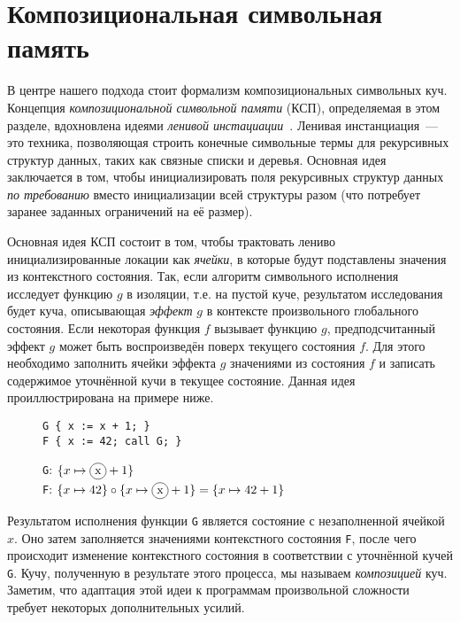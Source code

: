 \section{Композициональная символьная память}
\label{sec:state}

В центре нашего подхода стоит формализм композициональных символьных куч. Концепция \emph{композициональной символьной памяти} (КСП), определяемая в этом разделе, вдохновлена идеями \emph{ленивой инстациации}~\cite{khurshid2003generalized,deng2012efficient}. Ленивая инстанциация~--- это техника, позволяющая строить конечные символьные термы для рекурсивных структур данных, таких как связные списки и деревья. Основная идея заключается в том, чтобы инициализировать поля рекурсивных структур данных \emph{по требованию} вместо инициализации всей структуры разом (что потребует заранее заданных ограничений на её размер).

Основная идея КСП состоит в том, чтобы трактовать лениво инициализированные локации как \emph{ячейки}, в которые будут подставлены значения из контекстного состояния. Так, если алгоритм символьного исполнения исследует функцию $g$ в изоляции, т.е. на пустой куче, результатом исследования будет куча, описывающая \emph{эффект} $g$ в контексте произвольного глобального состояния. Если некоторая функция $f$ вызывает функцию $g$, предподсчитанный эффект $g$ может быть воспроизведён поверх текущего состояния $f$. Для этого необходимо заполнить ячейки эффекта $g$ значениями из состояния $f$ и записать содержимое уточнённой кучи в текущее состояние. Данная идея проиллюстрирована на примере ниже.
\begin{figure}[H]
\vspace*{-0.4in}
\begin{minipage}{.37\linewidth}
\begin{lstlisting}[style=demolang]
G { x := x + 1; }
F { x := 42; call G; }
\end{lstlisting}
\end{minipage}
\begin{minipage}{.62\linewidth}
\texttt{G}: $\{x \mapsto\encircle{x} + 1\}$\\
\texttt{F}: $\compose{\{x \mapsto 42\}}{\{x \mapsto\encircle{x} + 1\}}=\{x \mapsto 42 + 1\}$
\end{minipage}
\end{figure}
\vspace*{-0.4in}
Результатом исполнения функции \texttt{G} является состояние с незаполненной ячейкой $x$. Оно затем заполняется значениями контекстного состояния \texttt{F}, после чего происходит изменение контекстного состояния в соответствии с уточнённой кучей \texttt{G}. Кучу, полученную в результате этого процесса, мы называем \emph{композицией} куч. Заметим, что адаптация этой идеи к программам произвольной сложности требует некоторых дополнительных усилий.


